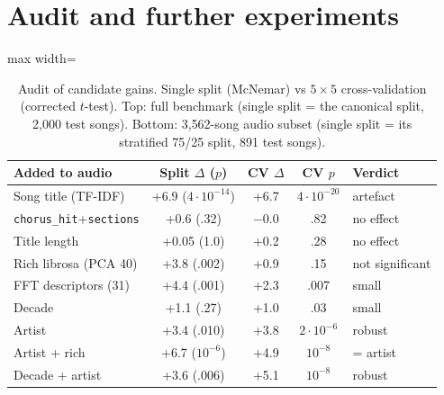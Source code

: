 \section{Audit and further experiments}\label{app:audit}\label{sec:audit}\label{sec:further}
\begin{table}[!htbp]
\centering
\caption{Audit of candidate gains. Single split (McNemar) vs $5{\times}5$ cross-validation
(corrected $t$-test). Top: full benchmark (single split = the canonical split, 2{,}000 test songs). Bottom:
3{,}562-song audio subset (single split = its stratified 75/25 split, 891 test songs).}
\label{tab:audit}
\footnotesize
\setlength{\tabcolsep}{2.6pt}
\begin{adjustbox}{max width=\columnwidth}
\begin{tabular}{@{}lcccl@{}}
\toprule
Added to audio & Split $\Delta$ ($p$) & CV $\Delta$ & CV $p$ & Verdict \\
\midrule
Song title (TF-IDF) & +6.9 ($4{\cdot}10^{-14}$) & +6.7 & $4{\cdot}10^{-20}$ & artefact \\
\texttt{chorus\_hit}+\texttt{sections} & +0.6 (.32) & $-$0.0 & .82 & no effect \\
Title length & +0.05 (1.0) & +0.2 & .28 & no effect \\
\midrule
Rich librosa (PCA 40) & +3.8 (.002) & +0.9 & .15 & not significant \\
FFT descriptors (31) & +4.4 (.001) & +2.3 & .007 & small \\
Decade & +1.1 (.27) & +1.0 & .03 & small \\
Artist & +3.4 (.010) & +3.8 & $2{\cdot}10^{-6}$ & robust \\
Artist + rich & +6.7 ($10^{-6}$) & +4.9 & $10^{-8}$ & = artist \\
Decade + artist & +3.6 (.006) & +5.1 & $10^{-8}$ & robust \\
\bottomrule
\end{tabular}
\end{adjustbox}
\end{table}

